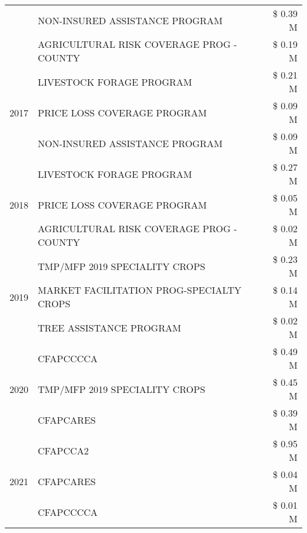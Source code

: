 \begin{tabular}{llr}
 & NON-INSURED ASSISTANCE PROGRAM                & \$ 0.39 M \\
 & AGRICULTURAL RISK COVERAGE PROG - COUNTY      & \$ 0.19 M \\
\cline{1-3}
\multirow[t]{3}{*}{2017} & LIVESTOCK FORAGE PROGRAM & \$ 0.21 M \\
 & PRICE LOSS COVERAGE PROGRAM & \$ 0.09 M \\
 & NON-INSURED ASSISTANCE PROGRAM & \$ 0.09 M \\
\cline{1-3}
\multirow[t]{3}{*}{2018} & LIVESTOCK FORAGE PROGRAM & \$ 0.27 M \\
 & PRICE LOSS COVERAGE PROGRAM & \$ 0.05 M \\
 & AGRICULTURAL RISK COVERAGE PROG - COUNTY & \$ 0.02 M \\
\cline{1-3}
\multirow[t]{3}{*}{2019} & TMP/MFP 2019 SPECIALITY CROPS & \$ 0.23 M \\
 & MARKET FACILITATION PROG-SPECIALTY CROPS & \$ 0.14 M \\
 & TREE ASSISTANCE PROGRAM & \$ 0.02 M \\
\cline{1-3}
\multirow[t]{3}{*}{2020} & CFAPCCCCA & \$ 0.49 M \\
 & TMP/MFP 2019 SPECIALITY CROPS & \$ 0.45 M \\
 & CFAPCARES & \$ 0.39 M \\
\cline{1-3}
\multirow[t]{3}{*}{2021} & CFAPCCA2 & \$ 0.95 M \\
 & CFAPCARES & \$ 0.04 M \\
 & CFAPCCCCA & \$ 0.01 M \\
\cline{1-3}
\bottomrule
\end{tabular}
